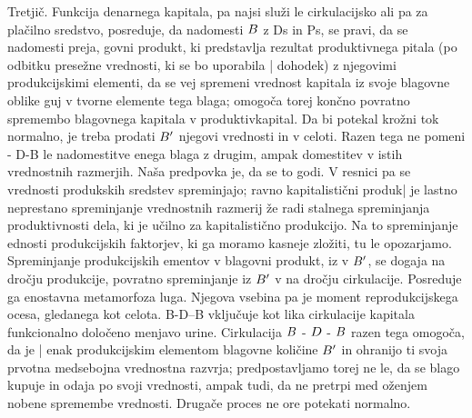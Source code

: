 \documentclass[kapital_02.tex]{subfiles}
\begin{document}
 Tretjič. Funkcija denarnega kapitala, pa najsi služi le cirkulacijsko ali pa za plačilno sredstvo, posreduje, da nadomesti \( B \) z Ds in Ps, se pravi, da se nadomesti preja, govni produkt, ki predstavlja rezultat produktivnega pitala (po odbitku presežne vrednosti, ki se bo uporabila | dohodek) z njegovimi produkcijskimi elementi, da se vej spremeni vrednost kapitala iz svoje blagovne oblike guj v tvorne elemente tega blaga; omogoča torej končno povratno spremembo blagovnega kapitala v produktivkapital. Da bi potekal krožni tok normalno, je treba prodati \( B' \) njegovi vrednosti in v celoti. Razen tega ne pomeni - D-B le nadomestitve enega blaga z drugim, ampak domestitev v istih vrednostnih razmerjih. Naša predpovka je, da se to godi. V resnici pa se vrednosti produkskih sredstev spreminjajo; ravno kapitalistični produk| je lastno neprestano spreminjanje vrednostnih razmerij že radi stalnega spreminjanja produktivnosti dela, ki je učilno za kapitalistično produkcijo. Na to spreminjanje ednosti produkcijskih faktorjev, ki ga moramo kasneje zložiti, tu le opozarjamo. Spreminjanje produkcijskih ementov v blagovni produkt, iz \KPEP v \( B' \), se dogaja na dročju produkcije, povratno spreminjanje iz \( B' \) v \KPEP na dročju cirkulacije. Posreduje ga enostavna metamorfoza luga. Njegova vsebina pa je moment reprodukcijskega ocesa, gledanega kot celota. B-D--B vključuje kot lika cirkulacije kapitala funkcionalno določeno menjavo urine. Cirkulacija \( B \) - \( D \) - \( B \) razen tega omogoča, da je | enak produkcijskim elementom blagovne količine \( B' \) in ohranijo ti svoja prvotna medsebojna vrednostna razvrja; predpostavljamo torej ne le, da se blago kupuje in odaja po svoji vrednosti, ampak tudi, da ne pretrpi med oženjem nobene spremembe vrednosti. Drugače proces ne ore potekati normalno.
\end{document}
